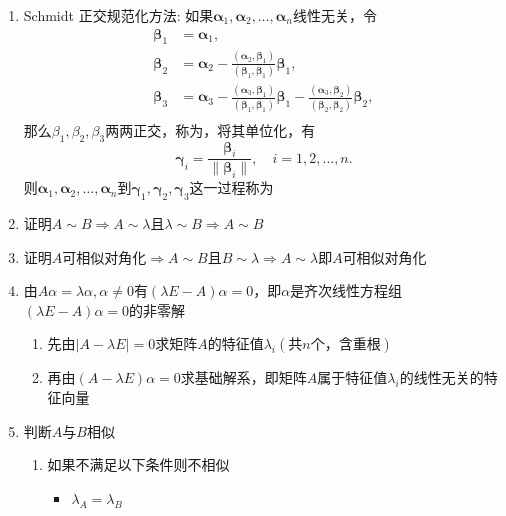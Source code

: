 \documentclass[a4paper,12pt]{article}
\begin{document}
    \begin{enumerate}
        \item Schmidt 正交规范化方法: 如果$\bm{\alpha}_1, \bm{\alpha}_2, \dots, \bm{\alpha}_n$线性无关，令
        \[
            \begin{aligned}
                \bm{\beta}_1 &= \bm{\alpha}_1, \\[6pt]
                \bm{\beta}_2 &= \bm{\alpha}_2 - \frac{(\bm{\alpha}_2, \bm{\beta}_1)}{(\bm{\beta}_1, \bm{\beta}_1)} \bm{\beta}_1, \\[6pt]
                \bm{\beta}_3 &= \bm{\alpha}_3 - \frac{(\bm{\alpha}_3, \bm{\beta}_1)}{(\bm{\beta}_1, \bm{\beta}_1)} \bm{\beta}_1
                - \frac{(\bm{\alpha}_3, \bm{\beta}_2)}{(\bm{\beta}_2, \bm{\beta}_2)} \bm{\beta}_2, \\[6pt]
            \end{aligned}
        \]
        那么$\beta_1, \beta_2, \beta_3$两两正交，称为{\color[rgb]{0.2, 0.6, 0.3}{正交向量组}}，将其单位化，有
        \[
            \bm{\gamma}_i = \frac{\bm{\beta}_i}{\|\bm{\beta}_i\|}, \quad i = 1, 2, \dots, n.
        \]
        则$\bm{\alpha}_1, \bm{\alpha}_2, \dots, \bm{\alpha}_n$到$\bm{\gamma}_1, \bm{\gamma}_2, \bm{\gamma}_3$这一过程称为{\color[rgb]{0.2, 0.6, 0.3}{Schmidt正交规范化}}
        \item 证明$A \sim B \Rightarrow A \sim \lambda \text{且} \lambda \sim B \Rightarrow A \sim B$
        \item 证明$A$可相似对角化$\Rightarrow A \sim B \text{且} B \sim \lambda \Rightarrow A \sim \lambda$即$A$可相似对角化
        \item 由$A\alpha = \lambda\alpha, \alpha \neq 0$有$(\lambda E - A)\alpha = 0$，即$\alpha$是齐次线性方程组$(\lambda E - A)\alpha = 0$的非零解
        \begin{enumerate}
            \item 先由$|A - \lambda E| = 0$求矩阵$A$的特征值$\lambda_i(\text{共}n\text{个，含重根})$
            \item 再由$(A - \lambda E)\alpha = 0$求基础解系，即矩阵$A$属于特征值$\lambda_i$的线性无关的特征向量
        \end{enumerate}
        \item 判断$A$与$B$相似
        \begin{enumerate}
            \item 如果不满足以下条件则不相似
            \begin{itemize}
                \item $\lambda_A = \lambda_B$

\end{itemize}
\end{enumerate}
\end{enumerate}
\end{document}
